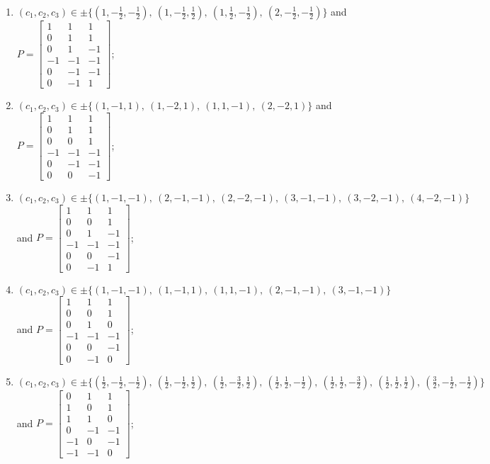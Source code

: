 \begin{enumerate}
\item[(d16)] $(c_1,c_2,c_3)\in \pm\{(1,-\tfrac{1}{2},-\tfrac{1}{2}),\allowbreak\ (1,-\tfrac{1}{2},\tfrac{1}{2}),\allowbreak\ (1,\tfrac{1}{2},-\tfrac{1}{2}),\allowbreak\ (2,-\tfrac{1}{2},-\tfrac{1}{2})\}$ and $P=\begin{bmatrix}1&1&1\\0&1&1\\0&1&-1\\-1&-1&-1\\0&-1&-1\\0&-1&1\end{bmatrix}$;
\item[(d17)] $(c_1,c_2,c_3)\in \pm\{(1,-1,1),\allowbreak\ (1,-2,1),\allowbreak\ (1,1,-1),\allowbreak\ (2,-2,1)\}$ and $P=\begin{bmatrix}1&1&1\\0&1&1\\0&0&1\\-1&-1&-1\\0&-1&-1\\0&0&-1\end{bmatrix}$;
\item[(d18)] $(c_1,c_2,c_3)\in \pm\{(1,-1,-1),\allowbreak\ (2,-1,-1),\allowbreak\ (2,-2,-1),\allowbreak\ (3,-1,-1),\allowbreak\ (3,-2,-1),\allowbreak\ (4,-2,-1)\}$ and $P=\begin{bmatrix}1&1&1\\0&0&1\\0&1&-1\\-1&-1&-1\\0&0&-1\\0&-1&1\end{bmatrix}$;
\item[(d19)] $(c_1,c_2,c_3)\in \pm\{(1,-1,-1),\allowbreak\ (1,-1,1),\allowbreak\ (1,1,-1),\allowbreak\ (2,-1,-1),\allowbreak\ (3,-1,-1)\}$ and $P=\begin{bmatrix}1&1&1\\0&0&1\\0&1&0\\-1&-1&-1\\0&0&-1\\0&-1&0\end{bmatrix}$;
\item[(d20)] $(c_1,c_2,c_3)\in \pm\{(\tfrac{1}{2},-\tfrac{1}{2},-\tfrac{1}{2}),\allowbreak\ (\tfrac{1}{2},-\tfrac{1}{2},\tfrac{1}{2}),\allowbreak\ (\tfrac{1}{2},-\tfrac{3}{2},\tfrac{1}{2}),\allowbreak\ (\tfrac{1}{2},\tfrac{1}{2},-\tfrac{1}{2}),\allowbreak\ (\tfrac{1}{2},\tfrac{1}{2},-\tfrac{3}{2}),\allowbreak\ (\tfrac{1}{2},\tfrac{1}{2},\tfrac{1}{2}),\allowbreak\ (\tfrac{3}{2},-\tfrac{1}{2},-\tfrac{1}{2})\}$ and $P=\begin{bmatrix}0&1&1\\1&0&1\\1&1&0\\0&-1&-1\\-1&0&-1\\-1&-1&0\end{bmatrix}$;

\end{enumerate}
